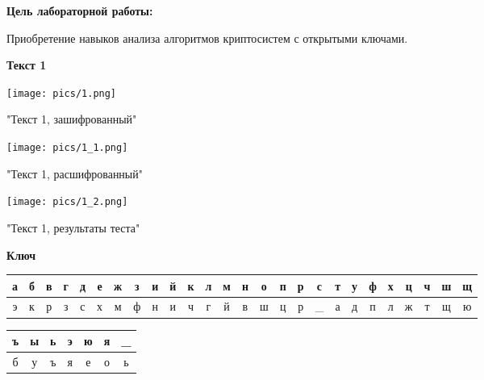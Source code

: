 \documentclass[a4paper,14pt]{extarticle}
\begin{document}
    \textbf{Цель лабораторной работы:} \par
    Приобретение навыков анализа алгоритмов криптосистем с открытыми ключами.

    \begin{center}
        \textbf{Текст 1}
    \end{center}

    \begin{center}
        \texttt{[image: pics/1.png]}

        "Текст 1, зашифрованный"
    \end{center}
    \begin{center}
        \texttt{[image: pics/1\_1.png]}

        "Текст 1, расшифрованный"
    \end{center}
    \begin{center}
        \texttt{[image: pics/1\_2.png]}

        "Текст 1, результаты теста"
    \end{center}
    \begin{center}
        \textbf{Ключ}
    \end{center}
    \vspace{-3em}
    \begin{center}
        \begin{tabular}{|c|c|c|c|c|c|c|c|c|c|c|c|c|c|c|c|c|c|c|c|c|c|c|c|c|c|}
            \hline
            а & б & в & г & д & е & ж & з & и & й & к & л & м & н & о & п & р & с & т & у & ф & х & ц & ч & ш & щ  \\
            \hline
            э & к & р & з & с & х & м & ф & н & и & ч & г & й & в & ш & ц & р &\_ & а & д & п & л & ж & т & щ & ю   \\
            \hline
        \end{tabular}
    \end{center}
    \begin{tabular}{|c|c|c|c|c|c|c|}
        \hline
        ъ & ы & ь & э & ю & я & \_ \\
        \hline
        б & у & ъ & я & е & о & ь \\
        \hline
    \end{tabular}\\
\end{document}
